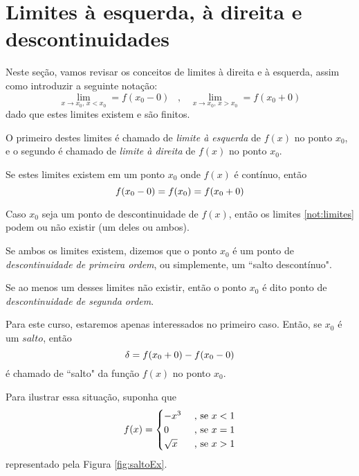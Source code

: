 \chapter{Limites à esquerda, à direita e descontinuidades}

Neste seção, vamos revisar os conceitos de limites à direita
e à esquerda, assim como introduzir a seguinte notação:
\begin{equation}
    \lim_{x\to x_0\text{, }x < x_0} = f(x_0 - 0)\hspace{10pt},\hspace{10pt}\lim_{x\to x_0\text{, }x > x_0} = f(x_0 + 0)
\label{not:limites}
\end{equation}
dado que estes limites existem e são finitos.

O primeiro destes limites é chamado de \textit{limite à esquerda}
de $f(x)$ no ponto $x_0$, e o segundo é chamado de \textit{limite à 
direita} de $f(x)$ no ponto $x_0$.

Se estes limites existem em um ponto $x_0$ onde $f(x)$ é contínuo, 
então
\begin{equation}
\notag
    f(x_0 - 0) = f(x_0) = f(x_0 + 0)
\end{equation}

Caso $x_0$ seja um ponto de descontinuidade de $f(x)$, então os 
limites \ref{not:limites} podem ou não existir (um deles ou ambos).

Se ambos os limites existem, dizemos que o ponto $x_0$ é um ponto
de \textit{descontinuidade de primeira ordem}, ou simplemente, um 
``salto descontínuo".

Se ao menos um desses limites não existir, então o ponto $x_0$ é 
dito ponto de \textit{descontinuidade de segunda ordem}.

Para este curso, estaremos apenas interessados no primeiro caso.
Então, se $x_0$ é um $salto$, então
\begin{equation}
\notag
    \delta = f(x_0 + 0) - f(x_0 - 0)
\end{equation}
é chamado de ``salto" da função $f(x)$ no ponto $x_0$.

Para ilustrar essa situação, suponha que 
\begin{equation}
\notag
    f(x)=\begin{cases}
        -x^3 &\text{ , se }x < 1\\
        0 &\text{ , se }x = 1\\
        \sqrt{x} &\text{ , se }x > 1
    \end{cases}
\end{equation}
representado pela Figura \ref{fig:saltoEx}.


